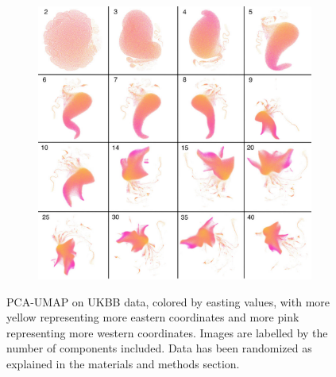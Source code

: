 \documentclass[12pt]{pnas-new}
\begin{document}
\begin{figure}
    \centering
    \begin{subfigure}{\textwidth}
    \includegraphics[width=\textwidth]{images/montage_ukbb_ew_pm.pdf}
    \end{subfigure}
    \caption{PCA-UMAP on UKBB data, colored by easting values, with more yellow representing more eastern coordinates and more pink representing more western coordinates. Images are labelled by the number of components included. Data has been randomized as explained in the materials and methods section.}
    \label{fig:supp_montage_ukbb_ew}
\end{figure}
\end{document}
